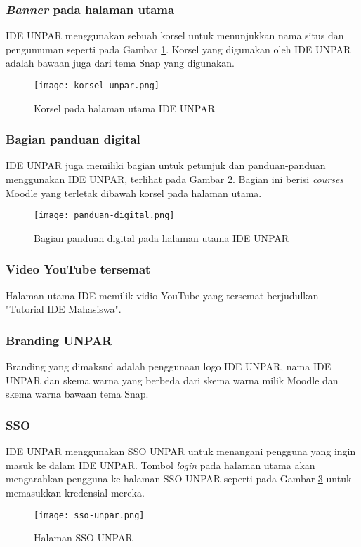 \subsubsection {\textit{Banner} pada halaman utama}
IDE UNPAR menggunakan sebuah korsel untuk menunjukkan nama situs dan pengumuman seperti pada Gambar \ref{fig:korsel-unpar}. Korsel yang digunakan oleh IDE UNPAR adalah bawaan juga dari tema Snap yang digunakan.
\begin{figure}[H] 
	\centering  
	\texttt{[image: korsel-unpar.png]}  
	\caption[Korsel pada halaman utama] {Korsel pada halaman utama IDE UNPAR} 
	\label{fig:korsel-unpar} 
\end{figure}
\subsubsection {Bagian panduan digital}
IDE UNPAR juga memiliki bagian untuk petunjuk dan panduan-panduan menggunakan IDE UNPAR, terlihat pada Gambar \ref{fig:panduan-digital}. Bagian ini berisi \textit{courses} Moodle yang terletak dibawah korsel pada halaman utama.  
\begin{figure}[H] 
	\centering  
	\texttt{[image: panduan-digital.png]}  
	\caption[Bagian panduan digital] {Bagian panduan digital pada halaman utama IDE UNPAR} 
	\label{fig:panduan-digital} 
\end{figure} 
\subsubsection {Video YouTube tersemat}
Halaman utama IDE memilik vidio YouTube yang tersemat berjudulkan "Tutorial IDE Mahasiswa".
\subsubsection {Branding UNPAR}
Branding yang dimaksud adalah penggunaan logo IDE UNPAR, nama IDE UNPAR dan skema warna yang berbeda dari skema warna milik Moodle dan skema warna bawaan tema Snap.
\subsubsection {SSO}
IDE UNPAR menggunakan SSO UNPAR untuk menangani pengguna yang ingin masuk ke dalam IDE UNPAR. Tombol \textit{login} pada halaman utama akan mengarahkan pengguna ke halaman SSO UNPAR seperti pada Gambar \ref{fig:sso-unpar} untuk memasukkan kredensial mereka.
\begin{figure}[H] 
	\centering  
	\texttt{[image: sso-unpar.png]}  
	\caption[Halaman SSO UNPAR] {Halaman SSO UNPAR} 
	\label{fig:sso-unpar} 
\end{figure} 

